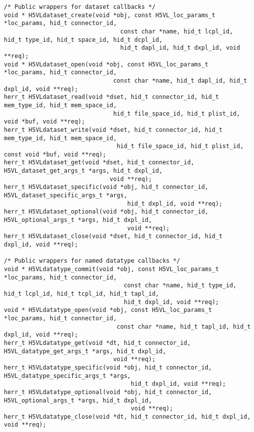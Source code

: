 \begin{appendices}
\begin{lstlisting}
/* Public wrappers for dataset callbacks */
void * H5VLdataset_create(void *obj, const H5VL_loc_params_t *loc_params, hid_t connector_id,
                                 const char *name, hid_t lcpl_id, hid_t type_id, hid_t space_id, hid_t dcpl_id,
                                 hid_t dapl_id, hid_t dxpl_id, void **req);
void * H5VLdataset_open(void *obj, const H5VL_loc_params_t *loc_params, hid_t connector_id,
                               const char *name, hid_t dapl_id, hid_t dxpl_id, void **req);
herr_t H5VLdataset_read(void *dset, hid_t connector_id, hid_t mem_type_id, hid_t mem_space_id,
                               hid_t file_space_id, hid_t plist_id, void *buf, void **req);
herr_t H5VLdataset_write(void *dset, hid_t connector_id, hid_t mem_type_id, hid_t mem_space_id,
                                hid_t file_space_id, hid_t plist_id, const void *buf, void **req);
herr_t H5VLdataset_get(void *dset, hid_t connector_id, H5VL_dataset_get_args_t *args, hid_t dxpl_id,
                              void **req);
herr_t H5VLdataset_specific(void *obj, hid_t connector_id, H5VL_dataset_specific_args_t *args,
                                   hid_t dxpl_id, void **req);
herr_t H5VLdataset_optional(void *obj, hid_t connector_id, H5VL_optional_args_t *args, hid_t dxpl_id,
                                   void **req);
herr_t H5VLdataset_close(void *dset, hid_t connector_id, hid_t dxpl_id, void **req);

/* Public wrappers for named datatype callbacks */
void * H5VLdatatype_commit(void *obj, const H5VL_loc_params_t *loc_params, hid_t connector_id,
                                  const char *name, hid_t type_id, hid_t lcpl_id, hid_t tcpl_id, hid_t tapl_id,
                                  hid_t dxpl_id, void **req);
void * H5VLdatatype_open(void *obj, const H5VL_loc_params_t *loc_params, hid_t connector_id,
                                const char *name, hid_t tapl_id, hid_t dxpl_id, void **req);
herr_t H5VLdatatype_get(void *dt, hid_t connector_id, H5VL_datatype_get_args_t *args, hid_t dxpl_id,
                               void **req);
herr_t H5VLdatatype_specific(void *obj, hid_t connector_id, H5VL_datatype_specific_args_t *args,
                                    hid_t dxpl_id, void **req);
herr_t H5VLdatatype_optional(void *obj, hid_t connector_id, H5VL_optional_args_t *args, hid_t dxpl_id,
                                    void **req);
herr_t H5VLdatatype_close(void *dt, hid_t connector_id, hid_t dxpl_id, void **req);


\end{lstlisting}
\end{appendices}
